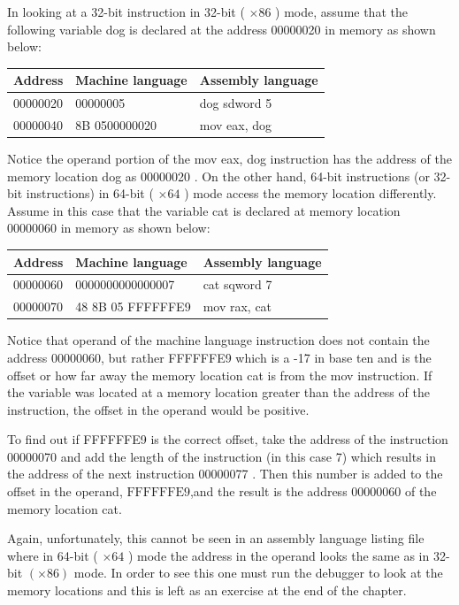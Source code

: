 \documentclass[10pt]{article}
\begin{document}
In looking at a 32-bit instruction in 32-bit ( $\times 86$ ) mode, assume that the following variable dog is declared at the address 00000020 in memory as shown below:

\begin{center}
\begin{tabular}{|l|l|l|}
\hline
Address & Machine language & Assembly language \\
\hline
00000020 & 00000005 & dog sdword 5 \\
\hline
00000040 & 8B 0500000020 & mov eax, dog \\
\hline
\end{tabular}
\end{center}

Notice the operand portion of the mov eax, dog instruction has the address of the memory location dog as 00000020 . On the other hand, 64-bit instructions (or 32-bit instructions) in 64-bit ( $\times 64$ ) mode access the memory location differently. Assume in this case that the variable cat is declared at memory location 00000060 in memory as shown below:

\begin{center}
\begin{tabular}{|l|l|l|}
\hline
Address & Machine language & Assembly language \\
\hline
00000060 & 0000000000000007 & cat sqword 7 \\
\hline
00000070 & 48 8B 05 FFFFFFE9 & mov rax, cat \\
\hline
\end{tabular}
\end{center}

Notice that operand of the machine language instruction does not contain the address 00000060, but rather FFFFFFE9 which is a -17 in base ten and is the offset or how far away the memory location cat is from the mov instruction. If the variable was located at a memory location greater than the address of the instruction, the offset in the operand would be positive.

To find out if FFFFFFE9 is the correct offset, take the address of the instruction 00000070 and add the length of the instruction (in this case 7) which results in the address of the next instruction 00000077 . Then this number is added to the offset in the operand, $\mathrm{FFFFFFE9}$,and the result is the address 00000060 of the memory location cat.

Again, unfortunately, this cannot be seen in an assembly language listing file where in 64-bit ( $\times 64$ ) mode the address in the operand looks the same as in 32-bit $(\times 86)$ mode. In order to see this one must run the debugger to look at the memory locations and this is left as an exercise at the end of the chapter.
\end{document}
